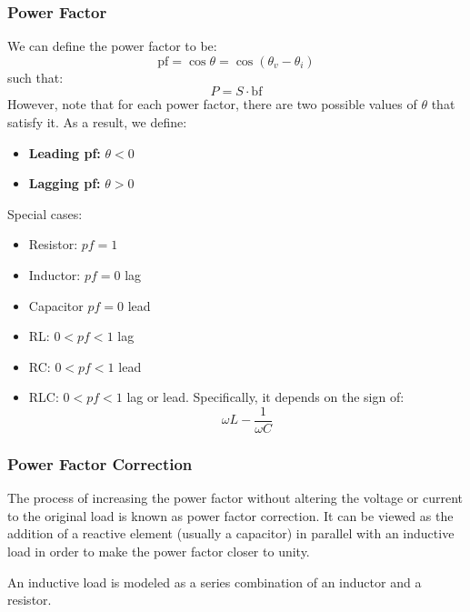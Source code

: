 \documentclass{article}
\begin{document}
\subsubsection{Power Factor}
We can define the power factor to be:
\begin{equation}
    \text{pf} = \cos\theta = \cos(\theta_v - \theta_i)
\end{equation}
such that:
\begin{equation}
    P = S \cdot \text{bf}
\end{equation}
However, note that for each power factor, there are two possible values of $\theta$ that satisfy it. As a result, we define:
\begin{itemize}
    \item \textbf{Leading pf:} $\theta<0$
    \item \textbf{Lagging pf:} $\theta>0$
\end{itemize}
Special cases:
\begin{itemize}
    \item Resistor: $pf=1$
    \item Inductor: $pf = 0$ lag
    \item Capacitor $pf = 0$ lead
    \item RL: $0<pf<1$ lag
    \item RC: $0<pf<1$ lead
    \item RLC: $0<pf<1$ lag or lead. Specifically, it depends on the sign of:
    \begin{equation}
        \omega L - \frac{1}{\omega C}
    \end{equation}
\end{itemize}
\subsubsection{Power Factor Correction}
The process of increasing the power factor without altering the voltage or current to the original load is known as power factor correction. It can be viewed as the addition of a reactive element (usually a capacitor) in parallel with an inductive load in order to make the power factor closer to unity.

An inductive load is modeled as a series combination of an inductor and a resistor.
\end{document}
